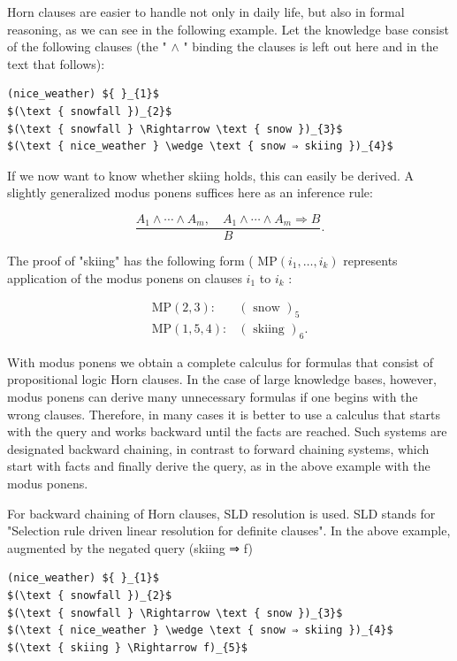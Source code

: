 \documentclass[10pt]{book}
\begin{document}
Horn clauses are easier to handle not only in daily life, but also in formal reasoning, as we can see in the following example. Let the knowledge base consist of the following clauses (the " $\wedge$ " binding the clauses is left out here and in the text that follows):

\begin{verbatim}
(nice_weather) ${ }_{1}$
$(\text { snowfall })_{2}$
$(\text { snowfall } \Rightarrow \text { snow })_{3}$
$(\text { nice_weather } \wedge \text { snow ⇒ skiing })_{4}$
\end{verbatim}

If we now want to know whether skiing holds, this can easily be derived. A slightly generalized modus ponens suffices here as an inference rule:

$$
\frac{A_{1} \wedge \cdots \wedge A_{m}, \quad A_{1} \wedge \cdots \wedge A_{m} \Rightarrow B}{B} .
$$

The proof of "skiing" has the following form ( $\mathrm{MP}\left(i_{1}, \ldots, i_{k}\right)$ represents application of the modus ponens on clauses $i_{1}$ to $i_{k}$ :

$$
\begin{array}{ll}
\mathrm{MP}(2,3): & (\text { snow })_{5} \\
\mathrm{MP}(1,5,4): & (\text { skiing })_{6} .
\end{array}
$$

With modus ponens we obtain a complete calculus for formulas that consist of propositional logic Horn clauses. In the case of large knowledge bases, however, modus ponens can derive many unnecessary formulas if one begins with the wrong clauses. Therefore, in many cases it is better to use a calculus that starts with the query and works backward until the facts are reached. Such systems are designated backward chaining, in contrast to forward chaining systems, which start with facts and finally derive the query, as in the above example with the modus ponens.

For backward chaining of Horn clauses, SLD resolution is used. SLD stands for "Selection rule driven linear resolution for definite clauses". In the above example, augmented by the negated query (skiing ⇒ f)

\begin{verbatim}
(nice_weather) ${ }_{1}$
$(\text { snowfall })_{2}$
$(\text { snowfall } \Rightarrow \text { snow })_{3}$
$(\text { nice_weather } \wedge \text { snow ⇒ skiing })_{4}$
$(\text { skiing } \Rightarrow f)_{5}$
\end{verbatim}
\end{document}
